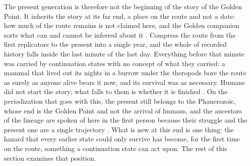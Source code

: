 The present generation is therefore not the beginning of the story of the
Golden Point. It inherits the story at its far end, a place on the route and not a date: how much of the route remains is not claimed here, and the Golden companion sorts what can and cannot be inferred about it \cite{GoldenReasoning}. Compress the route
from the first replicators to the present into a single year, and the
whole of recorded history falls inside the last minute of the last day.
Everything before that minute was carried by continuation states with no
concept of what they carried: a mammal that lived out its nights in a
burrow under the theropods bore the route as surely as anyone alive bears
it now, and its survival was as necessary. Humans did not start the story;
what falls to them is whether it is finished \cite{GoldenScience2022}.
On the periodization that goes with this, the present still belongs to
the Phanerozoic, whose end is the Golden Point and not the arrival of
humans, and the ancestors of the lineage are spoken of here in the
first person because their struggle and the present one are a single
trajectory \cite{GoldenReasoning}.
What is new at this end is one thing: the hazard that every earlier state
could only survive has become, for the first time on the route, something
a continuation state can act upon. The rest of this section examines that
position.

